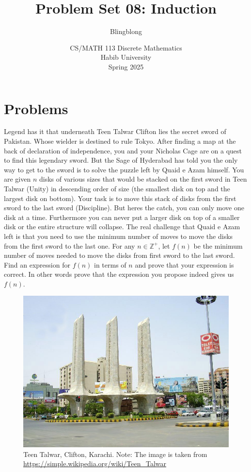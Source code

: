 \documentclass[a4paper]{exam}
\title{Problem Set 08: Induction}
\author{Blingblong} %
\date{CS/MATH 113 Discrete Mathematics\\Habib University\\Spring 2025}
\begin{document}
\maketitle      


\section*{Problems}
\begin{questions}
   Legend has it that underneath Teen Talwar Clifton lies the secret sword of Pakistan. Whose wielder is destined to rule Tokyo. After finding a map at the back of declaration of independence, you and your Nicholas Cage are on a quest to find this legendary sword. But the Sage of Hyderabad has told you the only way to get to the sword is to solve the puzzle left by Quaid e Azam himself. You are given $n$ disks of various sizes that would be stacked on the first sword in Teen Talwar (Unity) in descending order of size (the smallest disk on top and the largest disk on bottom). Your task is to move this stack of disks from the first sword to the last sword (Discipline). But heres the catch, you can only move one disk at a time. Furthermore you can never put a larger disk on top of a smaller disk or the entire structure will collapse. The real challenge that Quaid e Azam left is that you need to use the minimum number of moves to move the disks from the first sword to the last one. For any $n\in \mathbb{Z}^+$, let $f(n)$ be the minimum number of moves needed to move the disks from first sword to the last sword. Find an expression for $f(n)$ in terms of $n$ and prove that your expression is correct. In other words prove that the expression you propose indeed gives us $f(n)$.

\begin{figure}[h!]
  \centerline{\includegraphics[scale = 0.3]{Adnan_Asim's_Karachi_City._3_Talwar_(_Swords_)_Clifton,_Karachi.jpg}}
  \caption{Teen Talwar, Clifton, Karachi.
  Note: The image is taken from \href{https://simple.wikipedia.org/wiki/Teen_Talwar}{\url{https://simple.wikipedia.org/wiki/Teen_Talwar}}}
\end{figure}


\end{questions}
\end{document}

